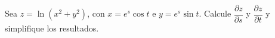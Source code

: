 Sea $z = \ln(x^2 + y^2)$, con $x = e^s \cos t$ e $y = e^s \sin t$. Calcule $\dfrac{\partial z}{\partial s}$ y $\dfrac{\partial z}{\partial t}$ y simplifique los resultados.
